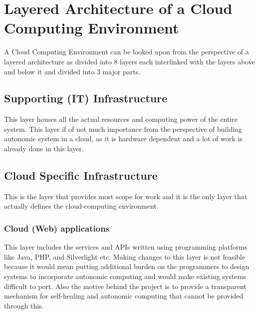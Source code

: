 
\chapter{Layered Architecture of a Cloud Computing Environment}
A Cloud Computing Environment can be looked upon from the perspective of a layered architecture as divided into 8 layers each interlinked with the layers above and below it and divided into 3 major parts.
\section{Supporting (IT) Infrastructure}
This layer houses all the actual resources and computing power of the entire system. This layer if of not much importance from the perspective of building autonomic system in a cloud, as it is hardware dependent and a lot of work is already done in this layer.
\section{Cloud Specific Infrastructure}
This is the layer that provides most scope for work and it is the only layer that actually defines the cloud-computing environment. 
\subsection{Cloud (Web) applications}
This layer includes the services and APIs written using programming platforms like Java, PHP, and Silverlight etc. Making changes to this layer is not feasible because it would mean putting additional burden on the programmers to design systems to incorporate autonomic computing and would make existing systems difficult to port. Also the motive behind the project is to provide a transparent mechanism for self-healing and autonomic computing that cannot be provided through this.
